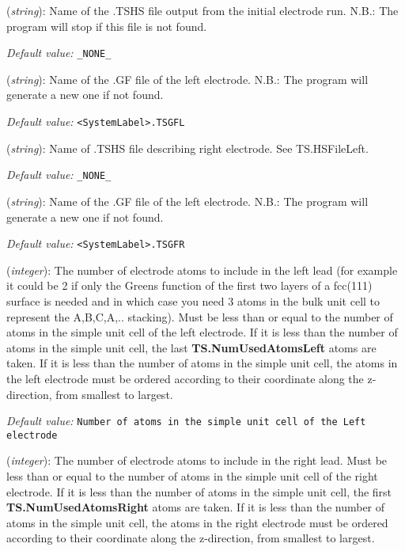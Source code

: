 \documentclass[11pt]{article}
\begin{document}
\begin{description}
\itemsep 10pt
\parsep 0pt

\item[{\bf TS.HSFileLeft }] ({\it string}): 
Name of the .TSHS file output from the initial electrode run. 
N.B.: The program will stop if this file is not found.

{\it Default value:} {\tt \_NONE\_} 

\item[{\bf TS.GFFileLeft }] ({\it string}): 
Name of the .GF file of the left electrode. 
N.B.: The program will generate a new one if not found.

{\it Default value:} {\tt <SystemLabel>.TSGFL} 

\item[{\bf TS.HSFileRight }] ({\it string}): 
Name of .TSHS file describing right electrode. See TS.HSFileLeft. 

{\it Default value:} {\tt \_NONE\_} 

\item[{\bf TS.GFFileRight }] ({\it string}): 
Name of the .GF file of the left electrode. 
N.B.: The program will generate a new one if not found.

{\it Default value:} {\tt <SystemLabel>.TSGFR} 

\item[{\bf TS.NumUsedAtomsLeft}] ({\it integer}):
   The number of
  electrode atoms to include in the left lead (for example it could be
  2 if only the Greens function of the first two layers of a fcc(111)
  surface is needed and in which case you need 3 atoms in the bulk
  unit cell to represent the A,B,C,A,.. stacking). Must be less than
  or equal to the number of atoms in the simple unit cell of the left
  electrode.  If it is less than the number of atoms in the simple
  unit cell, the last {\bf TS.NumUsedAtomsLeft} atoms are taken. If it
  is less than the number of atoms in the simple unit cell, the atoms
  in the left electrode must be ordered according to their coordinate
  along the z-direction, from smallest to largest.

{\it Default value:} {\tt Number of atoms in the simple unit cell of
  the Left electrode}

\item[{\bf TS.NumUsedAtomsRight}] ({\it integer}):
   The number
  of electrode atoms to include in the right lead. Must be less than
  or equal to the number of atoms in the simple unit cell of the right
  electrode. If it is less than the number of atoms in the simple unit
  cell, the first {\bf TS.NumUsedAtomsRight} atoms are taken. If it is
  less than the number of atoms in the simple unit cell, the atoms in
  the right electrode must be ordered according to their coordinate
  along the z-direction, from smallest to largest.


\end{description}
\end{document}
